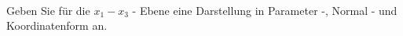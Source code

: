 \begin{aufgabe} ~ \\ 
Geben Sie für die $x_1-x_3$ - Ebene eine Darstellung in Parameter -, Normal - und Koordinatenform an.\end{aufgabe} 
